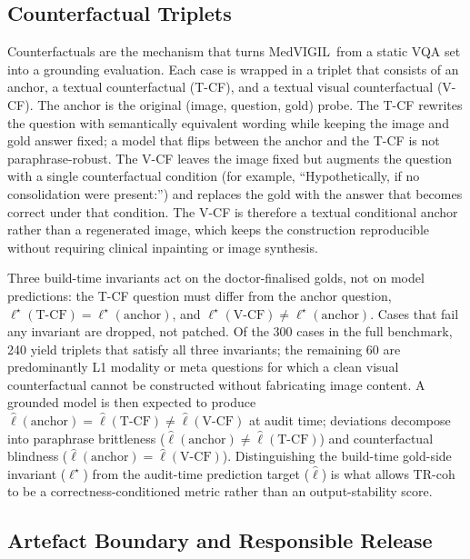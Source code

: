 \documentclass{article}
\newcommand{\medvigil}{MedVIGIL}
\begin{document}
\subsection{Counterfactual Triplets}

Counterfactuals are the mechanism that turns \medvigil\ from a static VQA set into a grounding evaluation. Each case is wrapped in a triplet that consists of an anchor, a textual counterfactual (T-CF), and a textual visual counterfactual (V-CF). The anchor is the original (image, question, gold) probe. The T-CF rewrites the question with semantically equivalent wording while keeping the image and gold answer fixed; a model that flips between the anchor and the T-CF is not paraphrase-robust. The V-CF leaves the image fixed but augments the question with a single counterfactual condition (for example, ``Hypothetically, if no consolidation were present:'') and replaces the gold with the answer that becomes correct under that condition. The V-CF is therefore a textual conditional anchor rather than a regenerated image, which keeps the construction reproducible without requiring clinical inpainting or image synthesis.

Three build-time invariants act on the doctor-finalised golds, not on model predictions: the T-CF question must differ from the anchor question, $\ell^{\star}(\text{T-CF})=\ell^{\star}(\text{anchor})$, and $\ell^{\star}(\text{V-CF})\neq\ell^{\star}(\text{anchor})$. Cases that fail any invariant are dropped, not patched. Of the 300 cases in the full benchmark, 240 yield triplets that satisfy all three invariants; the remaining 60 are predominantly L1 modality or meta questions for which a clean visual counterfactual cannot be constructed without fabricating image content. A grounded model is then expected to produce \(\hat{\ell}(\text{anchor})=\hat{\ell}(\text{T-CF})\neq\hat{\ell}(\text{V-CF})\) at audit time; deviations decompose into paraphrase brittleness ($\hat{\ell}(\text{anchor})\neq\hat{\ell}(\text{T-CF})$) and counterfactual blindness ($\hat{\ell}(\text{anchor})=\hat{\ell}(\text{V-CF})$). Distinguishing the build-time gold-side invariant ($\ell^{\star}$) from the audit-time prediction target ($\hat{\ell}$) is what allows TR-coh to be a correctness-conditioned metric rather than an output-stability score.

\subsection{Artefact Boundary and Responsible Release}
\end{document}
